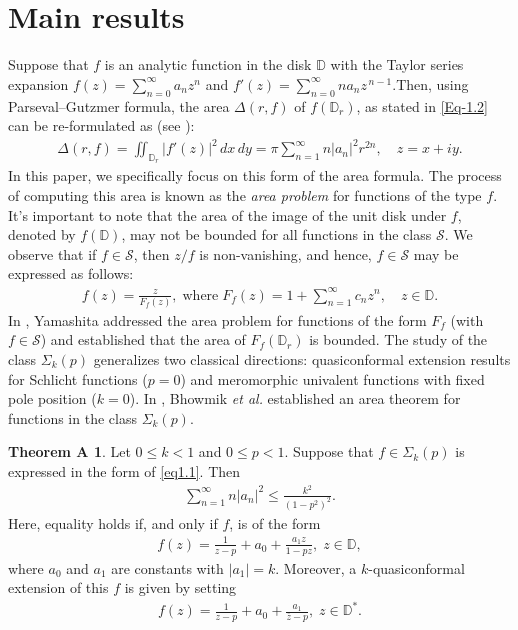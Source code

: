 \documentclass[a4paper,12pt]{amsart}
\theoremstyle{plain}
\theoremstyle{definition}
\newtheorem*{thmA}{Theorem A}
\newcounter {own}
\begin{document}
\section{\bf Main results}\label{Sec-2}
Suppose that $f$ is an analytic function in the disk $\mathbb{D}$ with the Taylor series expansion $f(z) = \sum_{n=0}^{\infty} a_n z^n$ and $f'(z) = \sum_{n=0}^{\infty} n a_n z^{\,n-1}$.Then, using Parseval--Gutzmer formula, the area $\Delta(r,f)$ of $f(\mathbb{D}_r)$, 
as stated in \eqref{Eq-1.2} can be re-formulated as (see \cite{Goodman}):
\begin{align}\label{Eq-2.1}
	\Delta(r,f) = \iint_{\mathbb{D}_r} |f'(z)|^2 \, dx \, dy 
	= \pi \sum_{n=1}^{\infty} n |a_n|^2 r^{2n}, \quad z = x + iy.
\end{align}
In this paper, we specifically focus on this form of the area formula. The process of computing this area is known as the \textit{area problem} for functions of the type $f$. It's important to note that the area of the image of the unit disk under $f$, denoted by $f(\mathbb{D})$, may not be bounded for all functions in the class $\mathcal{S}$. We observe that if $f \in \mathcal{S}$, then $z/f$ is non-vanishing, and hence, $f \in \mathcal{S}$ may be expressed as follows:
\begin{align*}
	f(z) = \frac{z}{F_f(z)},\; \mbox{where}\;
	F_f(z) = 1 + \sum_{n=1}^{\infty} c_n z^n, \quad z \in \mathbb{D}.
\end{align*}
In \cite{Yamashita-1990}, Yamashita addressed the area problem for functions of the form $F_f$ (with $f \in \mathcal{S}$) and established that the area of $F_f(\mathbb{D}_r)$ is bounded. The study of the class $\Sigma_{k}(p)$ generalizes two classical directions: quasiconformal extension results for Schlicht functions ($p=0$) and meromorphic univalent functions with fixed pole position ($k=0$). In \cite{Bhowmik-PAMS-2016}, Bhowmik \emph{et al.} established an area theorem for functions in the class $\Sigma_{k}(p)$.
\begin{thmA}\cite[Theorem 1]{Bhowmik-PAMS-2016}
	Let $0 \leq k < 1$ and $0 \leq p < 1$. Suppose that $f \in \Sigma_k(p)$ is expressed in the form of \eqref{eq1.1}. Then
	\begin{align}
		\sum_{n=1}^{\infty} n|a_n|^2 \leq \frac{k^2}{(1-p^2)^2}. \tag{1.3}
	\end{align}
	Here, equality holds if, and only if $f$, is of the form
	\begin{align}
		f(z) = \frac{1}{z-p} + a_0 + \frac{a_1 z}{1-pz},\; z \in \mathbb{D}, \tag{1.4}
	\end{align}
	where $a_0$ and $a_1$ are constants with $|a_1|=k$. Moreover, a $k$-quasiconformal extension of this $f$ is given by setting
	\begin{align}
		f(z) = \frac{1}{z-p} + a_0 + \frac{a_1}{\overline{z}-p},\;z \in \mathbb{D}^*.
	\end{align}
\end{thmA}
\end{document}
